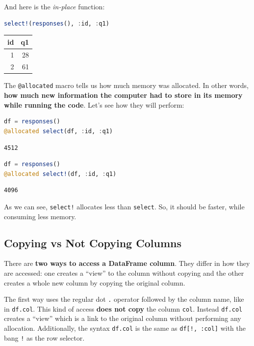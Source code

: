 \documentclass[
  notoc %
]{tufte-book}
\newcommand{\passthrough}[1]{#1}
\begin{document}
And here is the \emph{in-place} function:

\begin{lstlisting}[language=Julia]
select!(responses(), :id, :q1)
\end{lstlisting}

\begin{longtable}[]{@{}rr@{}}
\toprule()
id & q1 \\
\midrule()
\endhead
1 & 28 \\
2 & 61 \\
\bottomrule()
\end{longtable}

The \passthrough{\lstinline!@allocated!} macro tells us how much memory
was allocated. In other words, \textbf{how much new information the
computer had to store in its memory while running the code}. Let's see
how they will perform:

\begin{lstlisting}[language=Julia]
df = responses()
@allocated select(df, :id, :q1)
\end{lstlisting}

\begin{lstlisting}
4512
\end{lstlisting}

\begin{lstlisting}[language=Julia]
df = responses()
@allocated select!(df, :id, :q1)
\end{lstlisting}

\begin{lstlisting}
4096
\end{lstlisting}

As we can see, \passthrough{\lstinline"select!"} allocates less than
\passthrough{\lstinline!select!}. So, it should be faster, while
consuming less memory.

\hypertarget{sec:df_performance_df_copy}{%
\subsection{Copying vs Not Copying
Columns}\label{sec:df_performance_df_copy}}

There are \textbf{two ways to access a DataFrame column}. They differ in
how they are accessed: one creates a ``view'' to the column without
copying and the other creates a whole new column by copying the original
column.

The first way uses the regular dot \passthrough{\lstinline!.!} operator
followed by the column name, like in \passthrough{\lstinline!df.col!}.
This kind of access \textbf{does not copy} the column
\passthrough{\lstinline!col!}. Instead \passthrough{\lstinline!df.col!}
creates a ``view'' which is a link to the original column without
performing any allocation. Additionally, the syntax
\passthrough{\lstinline!df.col!} is the same as
\passthrough{\lstinline"df[!, :col]"} with the bang
\passthrough{\lstinline"!"} as the row selector.
\end{document}
